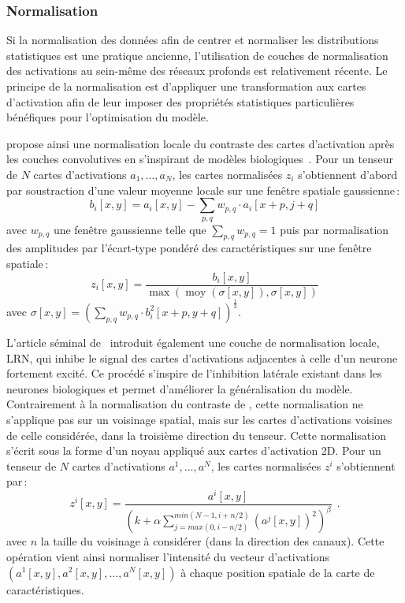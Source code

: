 \subsubsection{Normalisation}

Si la normalisation des données afin de centrer et normaliser les distributions statistiques est une pratique ancienne, l'utilisation de couches de normalisation des activations au sein-même des réseaux profonds est relativement récente. Le principe de la normalisation est d'appliquer une transformation aux cartes d'activation afin de leur imposer des propriétés statistiques particulières bénéfiques pour l'optimisation du modèle.

\citet{jarrett_what_2009} propose ainsi une normalisation locale du contraste des cartes d'activation après les couches convolutives en s'inspirant de modèles biologiques~\cite{pinto_why_2008}. Pour un tenseur de $N$ cartes d'activations $a_1,\dots,a_N$, les cartes normalisées $z_i$ s'obtiennent d'abord par soustraction d'une valeur moyenne locale sur une fenêtre spatiale gaussienne\,:
$$b_i[x,y] = a_i[x,y] - \sum_{p,q} w_{p,q} \cdot a_i[x+p,j+q]$$ avec $w_{p,q}$ une fenêtre gaussienne telle que $\sum_{p,q} w_{p,q} = 1$
puis par normalisation des amplitudes par l'écart-type pondéré des caractéristiques sur une fenêtre spatiale\,:
$$z_i[x,y] = \frac{b_i[x,y]}{\max(\operatorname{moy}(\sigma[x,y]), \sigma[x,y])}$$ avec $\sigma[x,y] = \left(\sum_{p,q} w_{p,q} \cdot b_i^2[x+p,y+q] \right)^{\frac{1}{2}}$.

L'article séminal de~\citet{krizhevsky_imagenet_2012} introduit également une couche de normalisation locale, \gls{LRN}, qui inhibe le signal des cartes d'activations adjacentes à celle d'un neurone fortement excité. Ce procédé s'inspire de l'inhibition latérale existant dans les neurones biologiques et permet d'améliorer la généralisation du modèle. Contrairement à la normalisation du contraste de \citet{jarrett_what_2009}, cette normalisation ne s'applique pas sur un voisinage spatial, mais sur les cartes d'activations voisines de celle considérée, dans la troisième direction du tenseur. Cette normalisation s'écrit sous la forme d'un noyau appliqué aux cartes d'activation 2D. Pour un tenseur de $N$ cartes d'activations $a^1,\dots,a^N$, les cartes normalisées $z^i$ s'obtiennent par\,:
$$z^i[x,y] = \frac{a^i[x,y]}{\left(k + \alpha \sum_{j=max(0, i-n/2)}^{min(N-1, i+n/2)} (a^j[x,y])^2  \right)^\beta}~~.$$
avec $n$ la taille du voisinage à considérer (dans la direction des canaux). Cette opération vient ainsi normaliser l'intensité du vecteur d'activations $(a^1[x,y], a^2[x,y], \dots, a^N[x,y])$ à chaque position spatiale de la carte de caractéristiques.


